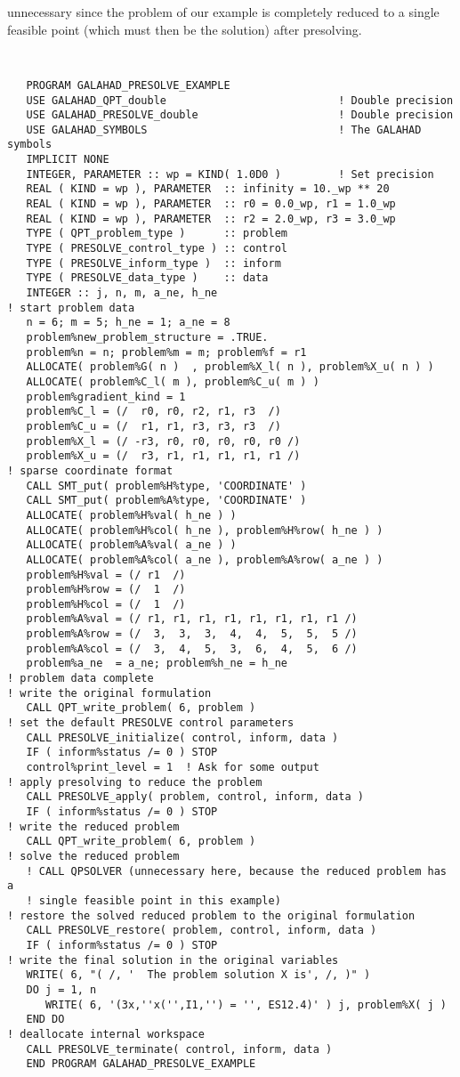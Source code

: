 \documentclass{galahad}
\begin{document}
unnecessary since the problem of our example is completely reduced to a single
feasible point (which must then be the solution) after presolving.
{\tt \small
\begin{verbatim}
   PROGRAM GALAHAD_PRESOLVE_EXAMPLE
   USE GALAHAD_QPT_double                           ! Double precision
   USE GALAHAD_PRESOLVE_double                      ! Double precision
   USE GALAHAD_SYMBOLS                              ! The GALAHAD symbols
   IMPLICIT NONE
   INTEGER, PARAMETER :: wp = KIND( 1.0D0 )         ! Set precision
   REAL ( KIND = wp ), PARAMETER  :: infinity = 10._wp ** 20
   REAL ( KIND = wp ), PARAMETER  :: r0 = 0.0_wp, r1 = 1.0_wp
   REAL ( KIND = wp ), PARAMETER  :: r2 = 2.0_wp, r3 = 3.0_wp
   TYPE ( QPT_problem_type )      :: problem
   TYPE ( PRESOLVE_control_type ) :: control
   TYPE ( PRESOLVE_inform_type )  :: inform
   TYPE ( PRESOLVE_data_type )    :: data
   INTEGER :: j, n, m, a_ne, h_ne
! start problem data
   n = 6; m = 5; h_ne = 1; a_ne = 8 
   problem%new_problem_structure = .TRUE.
   problem%n = n; problem%m = m; problem%f = r1
   ALLOCATE( problem%G( n )  , problem%X_l( n ), problem%X_u( n ) )
   ALLOCATE( problem%C_l( m ), problem%C_u( m ) )
   problem%gradient_kind = 1
   problem%C_l = (/  r0, r0, r2, r1, r3  /)
   problem%C_u = (/  r1, r1, r3, r3, r3  /)
   problem%X_l = (/ -r3, r0, r0, r0, r0, r0 /)
   problem%X_u = (/  r3, r1, r1, r1, r1, r1 /)
! sparse coordinate format
   CALL SMT_put( problem%H%type, 'COORDINATE' )
   CALL SMT_put( problem%A%type, 'COORDINATE' )
   ALLOCATE( problem%H%val( h_ne ) )
   ALLOCATE( problem%H%col( h_ne ), problem%H%row( h_ne ) )
   ALLOCATE( problem%A%val( a_ne ) )
   ALLOCATE( problem%A%col( a_ne ), problem%A%row( a_ne ) )
   problem%H%val = (/ r1  /)
   problem%H%row = (/  1  /)
   problem%H%col = (/  1  /)
   problem%A%val = (/ r1, r1, r1, r1, r1, r1, r1, r1 /)
   problem%A%row = (/  3,  3,  3,  4,  4,  5,  5,  5 /)
   problem%A%col = (/  3,  4,  5,  3,  6,  4,  5,  6 /)
   problem%a_ne  = a_ne; problem%h_ne = h_ne
! problem data complete
! write the original formulation
   CALL QPT_write_problem( 6, problem ) 
! set the default PRESOLVE control parameters            
   CALL PRESOLVE_initialize( control, inform, data )
   IF ( inform%status /= 0 ) STOP
   control%print_level = 1  ! Ask for some output
! apply presolving to reduce the problem
   CALL PRESOLVE_apply( problem, control, inform, data )
   IF ( inform%status /= 0 ) STOP
! write the reduced problem
   CALL QPT_write_problem( 6, problem ) 
! solve the reduced problem
   ! CALL QPSOLVER (unnecessary here, because the reduced problem has a 
   ! single feasible point in this example)
! restore the solved reduced problem to the original formulation
   CALL PRESOLVE_restore( problem, control, inform, data )
   IF ( inform%status /= 0 ) STOP
! write the final solution in the original variables
   WRITE( 6, "( /, '  The problem solution X is', /, )" )
   DO j = 1, n
      WRITE( 6, '(3x,''x('',I1,'') = '', ES12.4)' ) j, problem%X( j )
   END DO
! deallocate internal workspace
   CALL PRESOLVE_terminate( control, inform, data )
   END PROGRAM GALAHAD_PRESOLVE_EXAMPLE
\end{verbatim}
}
\end{document}
